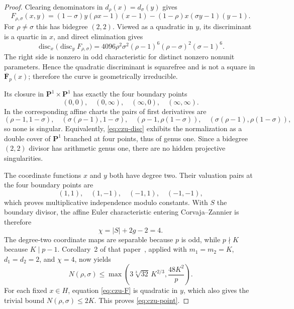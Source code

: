 \begin{proof}
Clearing denominators in $d_\rho(x)=d_\sigma(y)$ gives
\begin{equation}\label{eq:czu-F}
 F_{\rho,\sigma}(x,y)
 =(1-\sigma)y(\rho x-1)(x-1)
 -(1-\rho)x(\sigma y-1)(y-1).
\end{equation}
For $\rho\neq\sigma$ this has bidegree $(2,2)$.  Viewed as a quadratic in
$y$, its discriminant is a quartic in $x$, and direct elimination gives
\begin{equation}\label{eq:czu-disc}
 \operatorname{disc}_x\!\bigl(\operatorname{disc}_yF_{\rho,\sigma}\bigr)
 =4096\rho^2\sigma^2(\rho-1)^6(\rho-\sigma)^2(\sigma-1)^6.
\end{equation}
The right side is nonzero in odd characteristic for distinct nonzero
nonunit parameters.  Hence the quadratic discriminant is squarefree and is
not a square in $\overline{\mathbf F}_p(x)$; therefore the curve is
geometrically irreducible.

Its closure in $\mathbf P^1\times\mathbf P^1$ has exactly the four boundary
points
\[
 (0,0),\quad(0,\infty),\quad(\infty,0),\quad(\infty,\infty).
\]
In the corresponding affine charts the pairs of first derivatives are
\[
 (\rho-1,1-\sigma),\quad
 (\sigma(\rho-1),1-\sigma),\quad
 (\rho-1,\rho(1-\sigma)),\quad
 (\sigma(\rho-1),\rho(1-\sigma)),
\]
so none is singular.  Equivalently, \eqref{eq:czu-disc} exhibits the
normalization as a double cover of $\mathbf P^1$ branched at four points,
thus of genus one.  Since a bidegree $(2,2)$ divisor has arithmetic genus
one, there are no hidden projective singularities.

The coordinate functions $x$ and $y$ both have degree two.  Their valuation
pairs at the four boundary points are
\[
 (1,1),\quad(1,-1),\quad(-1,1),\quad(-1,-1),
\]
which proves multiplicative independence modulo constants.  With $S$ the
boundary divisor, the affine Euler characteristic entering
Corvaja--Zannier is therefore
\[
 \chi=|S|+2g-2=4.
\]
The degree-two coordinate maps are separable because $p$ is odd, while
$p\nmid K$ because $K\mid p-1$.  Corollary~2 of that paper~\cite{CorvajaZannier2013}, applied with
$m_1=m_2=K$, $d_1=d_2=2$, and $\chi=4$, now yields
\[
 N(\rho,\sigma)
 \leq\max\!\left(3\sqrt[3]{32}\,K^{2/3},\frac{48K^2}{p}\right).
\]
For each fixed $x\in H$, equation \eqref{eq:czu-F} is quadratic in $y$,
which also gives the trivial bound $N(\rho,\sigma)\leq2K$.  This proves
\eqref{eq:czu-point}.


\end{proof}
